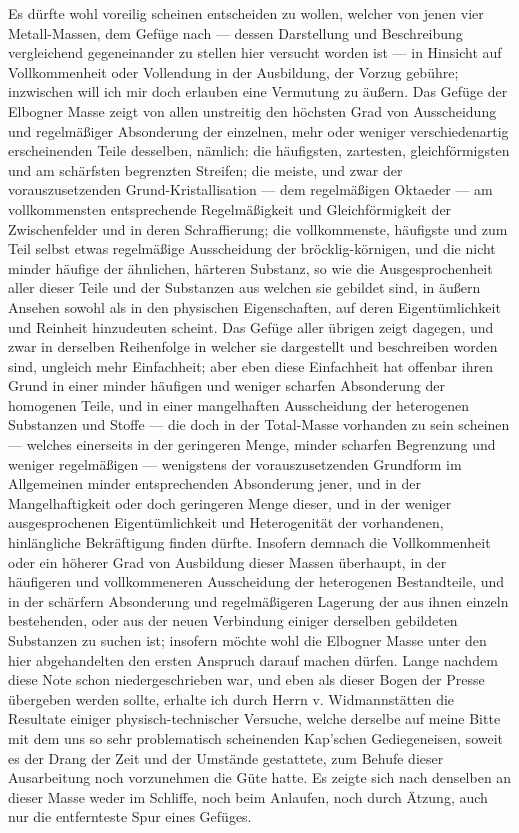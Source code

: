 \documentclass[a4paper, 11pt, oneside, german]{article}
\begin{document}
Es dürfte wohl voreilig scheinen entscheiden zu wollen, welcher von jenen vier Metall-Massen, dem Gefüge nach --- dessen Darstellung und Beschreibung vergleichend gegeneinander zu stellen hier versucht worden ist --- in Hinsicht auf Vollkommenheit oder Vollendung in der Ausbildung, der Vorzug gebühre; inzwischen will ich mir doch erlauben eine Vermutung zu äußern. Das Gefüge der Elbogner Masse zeigt von allen unstreitig den höchsten Grad von Ausscheidung und regelmäßiger Absonderung der einzelnen, mehr oder weniger verschiedenartig erscheinenden Teile desselben, nämlich: die häufigsten, zartesten, gleichförmigsten und am schärfsten begrenzten Streifen; die meiste, und zwar der vorauszusetzenden Grund-Kristallisation --- dem regelmäßigen Oktaeder --- am vollkommensten entsprechende Regelmäßigkeit und Gleichförmigkeit der Zwischenfelder und in deren Schraffierung; die vollkommenste, häufigste und zum Teil selbst etwas regelmäßige Ausscheidung der bröcklig-körnigen, und die nicht minder häufige der ähnlichen, härteren Substanz, so wie die Ausgesprochenheit aller dieser Teile und der Substanzen aus welchen sie gebildet sind, in äußern Ansehen sowohl als in den physischen Eigenschaften, auf deren Eigentümlichkeit und Reinheit hinzudeuten scheint. Das Gefüge aller übrigen zeigt dagegen, und zwar in derselben Reihenfolge in welcher sie dargestellt und beschreiben worden sind, ungleich mehr Einfachheit; aber eben diese Einfachheit hat offenbar ihren Grund in einer minder häufigen und weniger scharfen Absonderung der homogenen Teile, und in einer mangelhaften Ausscheidung der heterogenen Substanzen und Stoffe --- die doch in der Total-Masse vorhanden zu sein scheinen --- welches einerseits in der geringeren Menge, minder scharfen Begrenzung und weniger regelmäßigen --- wenigstens der vorauszusetzenden Grundform im Allgemeinen minder entsprechenden Absonderung jener, und in der Mangelhaftigkeit oder doch geringeren Menge dieser, und in der weniger ausgesprochenen Eigentümlichkeit und Heterogenität der vorhandenen, hinlängliche Bekräftigung finden dürfte. Insofern demnach die Vollkommenheit oder ein höherer Grad von Ausbildung dieser Massen überhaupt, in der häufigeren und vollkommeneren Ausscheidung der heterogenen Bestandteile, und in der schärfern Absonderung und regelmäßigeren Lagerung der aus ihnen einzeln bestehenden, oder aus der neuen Verbindung einiger derselben gebildeten Substanzen zu suchen ist; insofern möchte wohl die Elbogner Masse unter den hier abgehandelten den ersten Anspruch darauf machen dürfen.  
Lange nachdem diese Note schon niedergeschrieben war, und eben als dieser Bogen der Presse übergeben werden sollte, erhalte ich durch Herrn v. Widmannstätten die Resultate einiger physisch-technischer Versuche, welche derselbe auf meine Bitte mit dem uns so sehr problematisch scheinenden Kap’schen Gediegeneisen, soweit es der Drang der Zeit und der Umstände gestattete, zum Behufe dieser Ausarbeitung noch vorzunehmen die Güte hatte. Es zeigte sich nach denselben an dieser Masse weder im Schliffe, noch beim Anlaufen, noch durch Ätzung, auch nur die entfernteste Spur eines Gefüges.  
\end{document}
